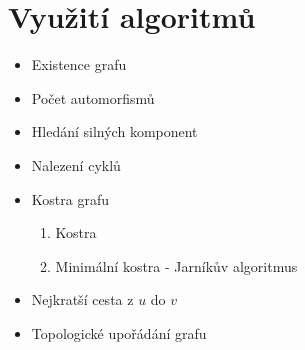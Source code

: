 \section{Využití algoritmů}
  \begin{itemize}
    \item Existence grafu
    \item Počet automorfismů
    \item Hledání silných komponent
    \item Nalezení cyklů
    \item Kostra grafu
      \begin{enumerate}
        \item Kostra
        \item Minimální kostra - Jarníkův algoritmus
      \end{enumerate}
    \item Nejkratší cesta z $u$ do $v$
    \item Topologické upořádání grafu
  \end{itemize}
